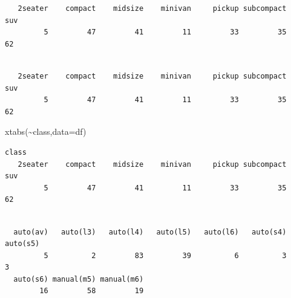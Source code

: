 \documentclass[
  letterpaper,
  DIV=11,
  numbers=noendperiod]{scrreprt}
\newenvironment{Shaded}{\begin{snugshade}}{\end{snugshade}}
\newcommand{\AttributeTok}[1]{\textcolor[rgb]{0.40,0.45,0.13}{#1}}
\newcommand{\FunctionTok}[1]{\textcolor[rgb]{0.28,0.35,0.67}{#1}}
\newcommand{\NormalTok}[1]{\textcolor[rgb]{0.00,0.23,0.31}{#1}}
\newcommand{\SpecialCharTok}[1]{\textcolor[rgb]{0.37,0.37,0.37}{#1}}
\begin{document}
\begin{verbatim}
   2seater    compact    midsize    minivan     pickup subcompact        suv 
         5         47         41         11         33         35         62 
\end{verbatim}

\begin{Shaded}
\end{Shaded}

\begin{verbatim}

   2seater    compact    midsize    minivan     pickup subcompact        suv 
         5         47         41         11         33         35         62 
\end{verbatim}

\begin{Shaded}
\begin{Highlighting}[]
\FunctionTok{xtabs}\NormalTok{(}\SpecialCharTok{\textasciitilde{}}\NormalTok{class,}\AttributeTok{data=}\NormalTok{df)}
\end{Highlighting}
\end{Shaded}

\begin{verbatim}
class
   2seater    compact    midsize    minivan     pickup subcompact        suv 
         5         47         41         11         33         35         62 
\end{verbatim}

\begin{Shaded}
\end{Shaded}

\begin{verbatim}

  auto(av)   auto(l3)   auto(l4)   auto(l5)   auto(l6)   auto(s4)   auto(s5) 
         5          2         83         39          6          3          3 
  auto(s6) manual(m5) manual(m6) 
        16         58         19 
\end{verbatim}

\begin{Shaded}
\end{Shaded}
\end{document}
